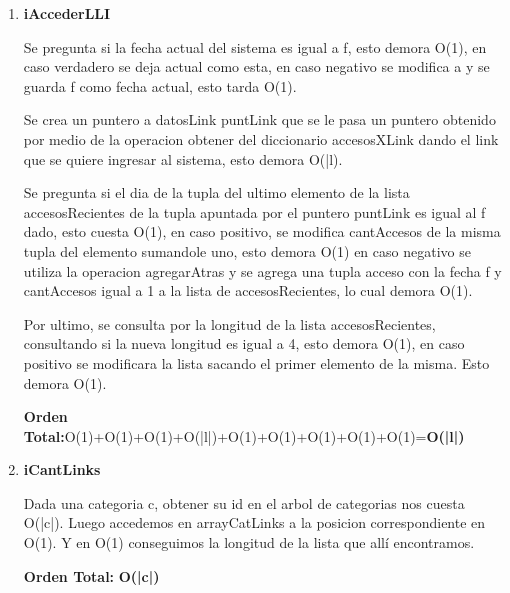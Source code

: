 \begin{enumerate}
\item\textbf{iAccederLLI}
\par Se pregunta si la fecha actual del sistema es igual a f, esto demora O(1), en caso verdadero se deja actual como esta, en caso negativo se modifica a y se guarda f como fecha actual, esto tarda O(1).
\par Se crea un puntero a datosLink puntLink que se le pasa un puntero obtenido por medio de la operacion obtener del diccionario accesosXLink dando el link que se quiere ingresar al sistema, esto demora O(|l). 
\par Se pregunta si el dia de la tupla del ultimo elemento de la lista accesosRecientes de la tupla apuntada por el puntero puntLink es igual al f dado, esto cuesta O(1), en caso positivo, se modifica cantAccesos de la misma tupla del elemento sumandole uno, esto demora O(1) en caso negativo se utiliza la operacion agregarAtras y se agrega una tupla acceso con la fecha f y cantAccesos igual a 1 a la lista de accesosRecientes, lo cual demora O(1).
\par Por ultimo, se consulta por la longitud de la lista accesosRecientes, consultando si la nueva longitud es igual a 4, esto demora O(1), en caso positivo se modificara la lista sacando el primer elemento de la misma. Esto demora O(1).
\par\textbf{Orden Total:}O(1)+O(1)+O(1)+O(|l|)+O(1)+O(1)+O(1)+O(1)+O(1)=\textbf{O(|l|)}

\item\textbf{iCantLinks}
\par Dada una categoria c, obtener su id en el arbol de categorias nos cuesta O(|c|). Luego accedemos en arrayCatLinks a la posicion correspondiente en O(1). Y en O(1) conseguimos la longitud de la lista que allí encontramos.
\par\textbf{Orden Total:} \textbf{O(|c|)}


\end{enumerate}
